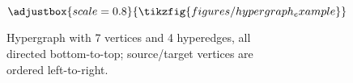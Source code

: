 \begin{figure}
	\begin{subfigure}[c]{0.3\linewidth}
		\centering


        \[
        \adjustbox{scale=0.8}{
        \tikzfig{figures/hypergraph_example}
        }
        \]
		\caption{Hypergraph with 7 vertices and 4 hyperedges, all directed bottom-to-top; source/target vertices are ordered left-to-right.}%
		\label{fig:hypergraph}
	\end{subfigure}
	\begin{subfigure}[c]{0.3\linewidth}
		\centering




\end{subfigure}
\end{figure}
